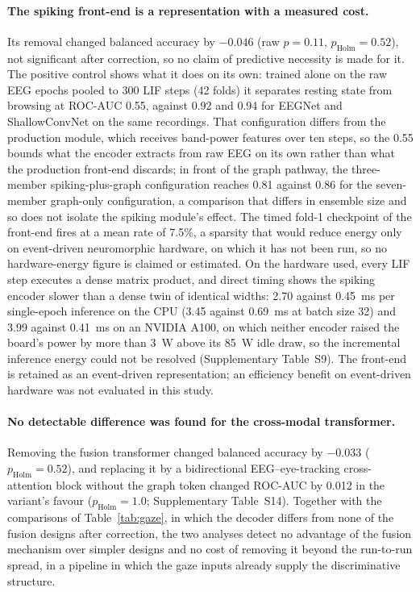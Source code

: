 \paragraph{The spiking front-end is a representation with a measured cost.} Its removal changed balanced accuracy by $-0.046$ (raw $p=0.11$, $p_{\mathrm{Holm}}=0.52$), not significant after correction, so no claim of predictive necessity is made for it. The positive control shows what it does on its own: trained alone on the raw EEG epochs pooled to 300 LIF steps (42 folds) it separates resting state from browsing at ROC-AUC 0.55, against 0.92 and 0.94 for EEGNet and ShallowConvNet on the same recordings. That configuration differs from the production module, which receives band-power features over ten steps, so the 0.55 bounds what the encoder extracts from raw EEG on its own rather than what the production front-end discards; in front of the graph pathway, the three-member spiking-plus-graph configuration reaches 0.81 against 0.86 for the seven-member graph-only configuration, a comparison that differs in ensemble size and so does not isolate the spiking module's effect. The timed fold-1 checkpoint of the front-end fires at a mean rate of 7.5\%, a sparsity that would reduce energy only on event-driven neuromorphic hardware, on which it has not been run, so no hardware-energy figure is claimed or estimated. On the hardware used, every LIF step executes a dense matrix product, and direct timing shows the spiking encoder slower than a dense twin of identical widths: 2.70 against 0.45~ms per single-epoch inference on the CPU (3.45 against 0.69~ms at batch size 32) and 3.99 against 0.41~ms on an NVIDIA A100, on which neither encoder raised the board's power by more than 3~W above its 85~W idle draw, so the incremental inference energy could not be resolved (Supplementary Table~S9). The front-end is retained as an event-driven representation; an efficiency benefit on event-driven hardware was not evaluated in this study.

\paragraph{No detectable difference was found for the cross-modal transformer.} Removing the fusion transformer changed balanced accuracy by $-0.033$ ($p_{\mathrm{Holm}}=0.52$), and replacing it by a bidirectional EEG--eye-tracking cross-attention block without the graph token changed ROC-AUC by 0.012 in the variant's favour ($p_{\mathrm{Holm}}=1.0$; Supplementary Table~S14). Together with the comparisons of Table~\ref{tab:gaze}, in which the decoder differs from none of the fusion designs after correction, the two analyses detect no advantage of the fusion mechanism over simpler designs and no cost of removing it beyond the run-to-run spread, in a pipeline in which the gaze inputs already supply the discriminative structure.

